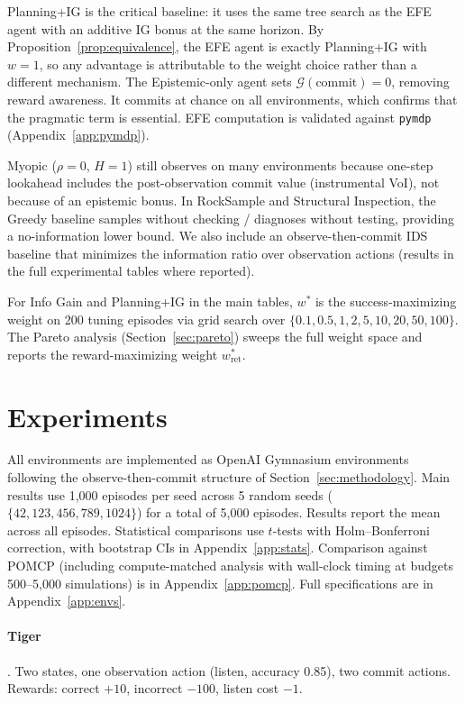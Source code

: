 \documentclass[runningheads]{llncs}
\begin{document}
Planning+IG is the critical baseline: it uses the same tree search as the EFE agent with an additive IG bonus at the same horizon. By Proposition~\ref{prop:equivalence}, the EFE agent is exactly Planning+IG with $w{=}1$, so any advantage is attributable to the weight choice rather than a different mechanism. The Epistemic-only agent sets $\mathcal{G}(\text{commit}) = 0$, removing reward awareness. It commits at chance on all environments, which confirms that the pragmatic term is essential. EFE computation is validated against \texttt{pymdp} \citep{heins2022} (Appendix~\ref{app:pymdp}).

Myopic ($\rho{=}0$, $H{=}1$) still observes on many environments because one-step lookahead includes the post-observation commit value (instrumental VoI), not because of an epistemic bonus. In RockSample and Structural Inspection, the Greedy baseline samples without checking / diagnoses without testing, providing a no-information lower bound. We also include an observe-then-commit IDS baseline \citep{russo2014} that minimizes the information ratio over observation actions (results in the full experimental tables where reported).

For Info Gain and Planning+IG in the main tables, $w^*$ is the success-maximizing weight on 200 tuning episodes via grid search over $\{0.1, 0.5, 1, 2, 5, 10, 20, 50, 100\}$. The Pareto analysis (Section~\ref{sec:pareto}) sweeps the full weight space and reports the reward-maximizing weight $w^*_{\mathrm{ret}}$.

\section{Experiments}

All environments are implemented as OpenAI Gymnasium environments following the observe-then-commit structure of Section~\ref{sec:methodology}. Main results use 1{,}000 episodes per seed across 5 random seeds ($\{42, 123, 456, 789, 1024\}$) for a total of 5{,}000 episodes. Results report the mean across all episodes. Statistical comparisons use $t$-tests with Holm--Bonferroni correction, with bootstrap CIs in Appendix~\ref{app:stats}. Comparison against POMCP (including compute-matched analysis with wall-clock timing at budgets 500--5{,}000 simulations) is in Appendix~\ref{app:pomcp}. Full specifications are in Appendix~\ref{app:envs}.

\paragraph{Tiger} \citep{kaelbling1998}. Two states, one observation action (listen, accuracy 0.85), two commit actions. Rewards: correct $+10$, incorrect $-100$, listen cost $-1$.
\end{document}
